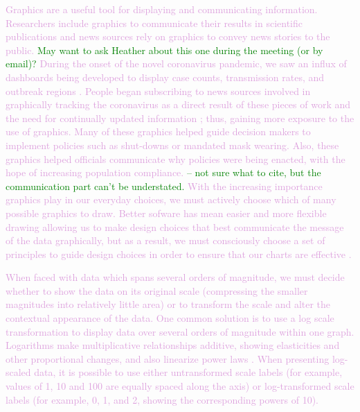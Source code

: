 \documentclass[]{interact}
\theoremstyle{plain}%
\theoremstyle{definition}
\theoremstyle{remark}
\begin{document}
\textcolor{Plum}{Graphics are a useful tool for displaying and communicating information. \citep{vanderplas2020testing}
Researchers include graphics to communicate their results in scientific publications and news sources rely on graphics to convey news stories to the public.}
\textcolor{Green}{May want to ask Heather about this one during the meeting (or by email)?}
\textcolor{Plum}{During the onset of the novel coronavirus pandemic, we saw an influx of dashboards being developed to display case counts, transmission rates, and outbreak regions \citep{lisa_charlotte_2020}.
People began subscribing to news sources involved in graphically tracking the coronavirus as a direct result of these pieces of work and the need for continually updated information \citep{rost_2020}; thus, gaining more exposure to the use of graphics.
}
\textcolor{Plum}{Many of these graphics helped guide decision makers to implement policies such as shut-downs or mandated mask wearing.
Also, these graphics helped officials communicate why policies were being enacted, with the hope of increasing population compliance.}
\textcolor{Green}{-- not sure what to cite, but the communication part can't be understated.}
\textcolor{Plum}{With the increasing importance graphics play in our everyday choices, we must actively choose which of many possible graphics to draw. 
Better sofware has mean easier and more flexible drawing allowing us to make design choices that best communicate the message of the data graphically, but as a result, we must consciously choose a set of principles to guide design choices in order to ensure that our charts are effective \citep{unwin_why_2020}.}

\textcolor{Plum}{
When faced with data which spans several orders of magnitude, we must decide whether to show the data on its original scale (compressing the smaller magnitudes into relatively little area) or to transform the scale and alter the contextual appearance of the data.
One common solution is to use a log scale transformation to display data over several orders of magnitude within one graph.
Logarithms make multiplicative relationships additive, showing elasticities and other proportional changes, and also linearize power laws \citep{menge_logarithmic_2018}. 
When presenting log-scaled data, it is possible to use either untransformed scale labels (for example, values of 1, 10 and 100 are equally spaced along the axis) or log-transformed scale labels (for example, 0, 1, and 2, showing the corresponding powers of 10).
}
\end{document}
